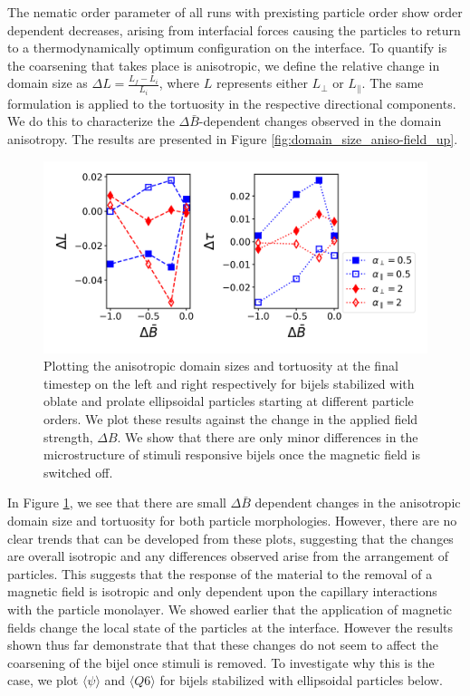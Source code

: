 The nematic order parameter of all runs with prexisting particle order
show order dependent decreases, arising from interfacial forces causing
the particles to return to a thermodynamically optimum configuration on
the interface. To quantify is the coarsening that takes place is
anisotropic, we define the relative change in domain size as
\(\Delta L = \frac{L_{f} - L_{i}}{L_{i}}\), where \(L\) represents
either \(L_{\perp}\) or \(L_{\parallel}\). The same formulation is
applied to the tortuosity in the respective directional components. We
do this to characterize the \(\Delta \bar{B}\)-dependent changes
observed in the domain anisotropy. The results are presented in Figure
\ref{fig:domain_size_aniso-field_up}.

\begin{figure} 
\centering 
\includegraphics[scale = 0.5]{../figures/results/paper2/domain_size_aniso-field_down.png} 
\caption{Plotting the anisotropic domain sizes and tortuosity at the final timestep on the left and right respectively for bijels stabilized with oblate and prolate ellipsoidal particles starting at different particle orders. We plot these results against the change in the applied field strength, $\Delta B$. We show that there are only minor differences in the microstructure of stimuli responsive bijels once the magnetic field is switched off.} 
\label{fig:domain_size_aniso-field_down} 
\end{figure}

In Figure \ref{fig:domain_size_aniso-field_down}, we see that there are
small \(\Delta \bar{B}\) dependent changes in the anisotropic domain
size and tortuosity for both particle morphologies. However, there are
no clear trends that can be developed from these plots, suggesting that
the changes are overall isotropic and any differences observed arise
from the arrangement of particles. This suggests that the response of
the material to the removal of a magnetic field is isotropic and only
dependent upon the capillary interactions with the particle monolayer.
We showed earlier that the application of magnetic fields change the
local state of the particles at the interface. However the results shown
thus far demonstrate that that these changes do not seem to affect the
coarsening of the bijel once stimuli is removed. To investigate why this
is the case, we plot \(\langle \psi \rangle\) and
\(\langle Q6 \rangle\) for bijels stabilized with ellipsoidal particles
below.

